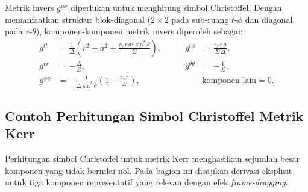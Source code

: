 Metrik invers $g^{\mu\nu}$ diperlukan untuk menghitung simbol Christoffel. Dengan memanfaatkan struktur blok-diagonal ($2 \times 2$ pada sub-ruang $t$-$\phi$ dan diagonal pada $r$-$\theta$), komponen-komponen metrik invers diperoleh sebagai:
\begin{equation}
\begin{aligned}
    g^{tt} &= \frac{1}{\Delta}\left(r^2 + a^2 + \frac{r_s\, r\, a^2 \sin^2\!\theta}{\Sigma}\right), &\qquad
    g^{t\phi} &= \frac{r_s\, r\, a}{\Sigma\,\Delta}, \\[6pt]
    g^{rr} &= -\frac{\Delta}{\Sigma}, &\qquad
    g^{\theta\theta} &= -\frac{1}{\Sigma}, \\[6pt]
    g^{\phi\phi} &= -\frac{1}{\Delta\sin^2\!\theta}\left(1 - \frac{r_s\, r}{\Sigma}\right), &\qquad
    & \text{komponen lain} = 0.
\end{aligned}
    \label{eq:kerr-inverse}
\end{equation}


\subsection{Contoh Perhitungan Simbol Christoffel Metrik Kerr}
\label{subsec:christoffel-kerr-contoh}

Perhitungan simbol Christoffel untuk metrik Kerr menghasilkan sejumlah besar komponen yang tidak bernilai nol. Pada bagian ini disajikan derivasi eksplisit untuk tiga komponen representatif yang relevan dengan efek \textit{frame-dragging}.

